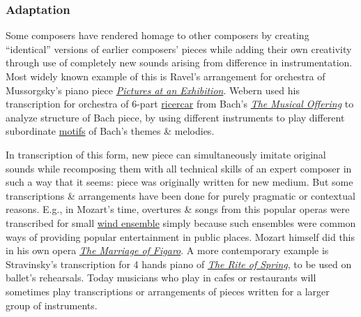 \documentclass{article}
\begin{document}
\subsubsection{Adaptation}
Some composers have rendered homage to other composers by creating ``identical'' versions of earlier composers' pieces while adding their own creativity through use of completely new sounds arising from difference in instrumentation. Most widely known example of this is {\sc Ravel}'s arrangement for orchestra of {\sc Mussorgsky}'s piano piece \href{https://en.wikipedia.org/wiki/Pictures_at_an_Exhibition}{\it Pictures at an Exhibition}. {\sc Webern} used his transcription for orchestra of 6-part \href{https://en.wikipedia.org/wiki/Ricercar}{ricercar} from {\sc Bach}'s \href{https://en.wikipedia.org/wiki/The_Musical_Offering}{\it The Musical Offering} to analyze structure of Bach piece, by using different instruments to play different subordinate \href{https://en.wikipedia.org/wiki/Motif_(music)}{motifs} of Bach's themes \& melodies.

In transcription of this form, new piece can simultaneously imitate original sounds while recomposing them with all technical skills of an expert composer in such a way that it seems: piece was originally written for new medium. But some transcriptions \& arrangements have been done for purely pragmatic or contextual reasons. E.g., in Mozart's time, overtures \& songs from this popular operas were transcribed for small \href{https://en.wikipedia.org/wiki/Wind_ensemble}{wind ensemble} simply because such ensembles were common ways of providing popular entertainment in public places. {\sc Mozart} himself did this in his own opera \href{https://en.wikipedia.org/wiki/The_Marriage_of_Figaro}{\it The Marriage of Figaro}. A more contemporary example is {\sc Stravinsky}'s transcription for 4 hands piano of \href{https://en.wikipedia.org/wiki/The_Rite_of_Spring}{\it The Rite of Spring}, to be used on ballet's rehearsals. Today musicians who play in cafes or restaurants will sometimes play transcriptions or arrangements of pieces written for a larger group of instruments.
\end{document}
